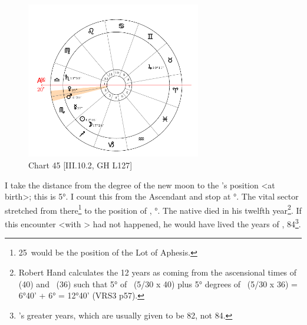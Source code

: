 \clearpage
\begin{figure}
\centering
\vspace{-20pt}
\includegraphics[width=0.68\textwidth]{charts/3_10_2}
\caption{Chart 45 [III.10.2, GH L127]}
\label{fig:chart45}
\end{figure} 


I take the distance from the degree of the new moon to the \Moon’s position <at birth>; this is 5°. I count this from the Ascendant and stop at \Libra\xspace 25°. The vital sector stretched from there\footnote{25\Libra\, would be the position of the Lot of Aphesis.} to the position of \Mars, \Scorpio\xspace 5°. The native died in his twelfth year\footnote{Robert Hand calculates the 12 years as coming from the ascensional times of \Libra\, (40) and \Scorpio\, (36) such that 5° of \Libra\, (5/30 x 40) plus 5° degrees of \Scorpio\, (5/30 x 36) = 6°40' + 6° = 12°40' (VRS3 p57).}. If this encounter <with \Mars> had not happened, he would have lived the years of \Venus, 84\footnote{\Venus's greater years, which are usually given to be 82, not 84.}.

\newpage